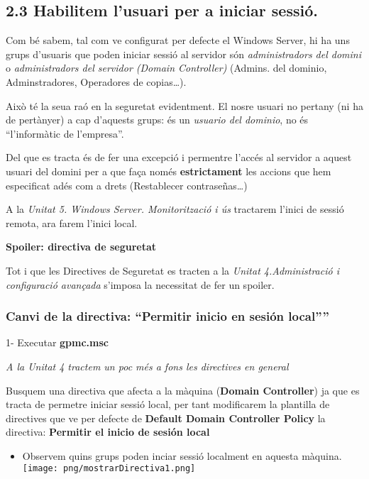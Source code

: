 \documentclass[
  a4paper,
]{article}
\providecommand{\tightlist}{%
  \setlength{\itemsep}{0pt}\setlength{\parskip}{0pt}}
\begin{document}
\subsection{2.3 Habilitem l'usuari per a iniciar
sessió.}\label{habilitem-lusuari-per-a-iniciar-sessiuxf3.}

Com bé sabem, tal com ve configurat per defecte el Windows Server, hi ha
uns grups d'usuaris que poden iniciar sessió al servidor són
\emph{administradors del domini} o \emph{administradors del servidor
(Domain Controller)} (Admins. del dominio, Adminstradores, Operadores de
copias\ldots).

Això té la seua raó en la seguretat evidentment. El nosre usuari no
pertany (ni ha de pertànyer) a cap d'aquests grups: és un \emph{usuario
del dominio}, no és ``l'informàtic de l'empresa''.

Del que es tracta és de fer una excepció i permentre l'accés al servidor
a aquest usuari del domini per a que faça només \textbf{estrictament}
les accions que hem especificat adés com a drets (Restablecer
contraseñas\ldots)

A la \emph{Unitat 5. Windows Server. Monitorització i ús} tractarem
l'inici de sessió remota, ara farem l'inici local.

\textbf{Spoiler: directiva de seguretat}

Tot i que les Directives de Seguretat es tracten a la \emph{Unitat
4.Administració i configuració avançada} s'imposa la necessitat de fer
un spoiler.

\subsubsection{\texorpdfstring{Canvi de la directiva: ``Permitir inicio
en sesión
local''''}{Canvi de la directiva: ``Permitir inicio en sesión local''\,''}}\label{canvi-de-la-directiva-permitir-inicio-en-sesiuxf3n-local}

1- Executar \textbf{gpmc.msc}

\emph{A la Unitat 4 tractem un poc més a fons les directives en general}

Busquem una directiva que afecta a la màquina (\textbf{Domain
Controller}) ja que es tracta de permetre iniciar sessió local, per tant
modificarem la plantilla de directives que ve per defecte de
\textbf{Default Domain Controller Policy} la directiva: \textbf{Permitir
el inicio de sesión local}

\begin{itemize}
\tightlist
\item
  Observem quins grups poden inciar sessió localment en aquesta màquina.
  \texttt{[image: png/mostrarDirectiva1.png]}
\end{itemize}
\end{document}
